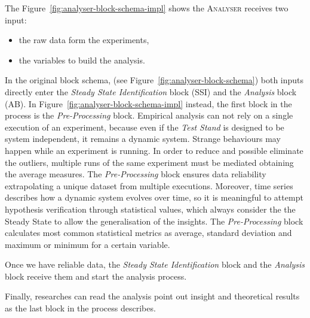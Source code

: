 The Figure~\ref{fig:analyser-block-schema-impl} shows the \textsc{Analyser} receives two input:
\begin{itemize}
\item the raw data form the experiments,
\item the variables to build the analysis.
\end{itemize}

In the original block schema, (see Figure~\ref{fig:analyser-block-schema}) both inputs directly enter the \textit{Steady State Identification} block (SSI) and the \textit{Analysis} block (AB). In Figure~\ref{fig:analyser-block-schema-impl} instead, the first block in the process is the \textit{Pre-Processing} block. Empirical analysis can not rely on a single execution of an experiment, because even if the \textit{Test Stand} is designed to be system independent, it remains a dynamic system. Strange behaviours may happen while an experiment is running. In order to reduce and possible eliminate the outliers, multiple runs of the same experiment must be mediated obtaining the average measures. The \textit{Pre-Processing} block ensures data reliability extrapolating a unique dataset from multiple executions. Moreover, time series describes how a dynamic system evolves over time, so it is meaningful to attempt hypothesis verification through statistical values, which always consider the the Steady State to allow the generalisation of the insights. The \textit{Pre-Processing} block calculates most common statistical metrics as average, standard deviation and maximum or minimum for a certain variable.


Once we have reliable data, the \textit{Steady State Identification} block and the \textit{Analysis} block receive them and start the analysis process. 

Finally, researches can read the analysis point out insight and theoretical results as the last block in the process describes.


